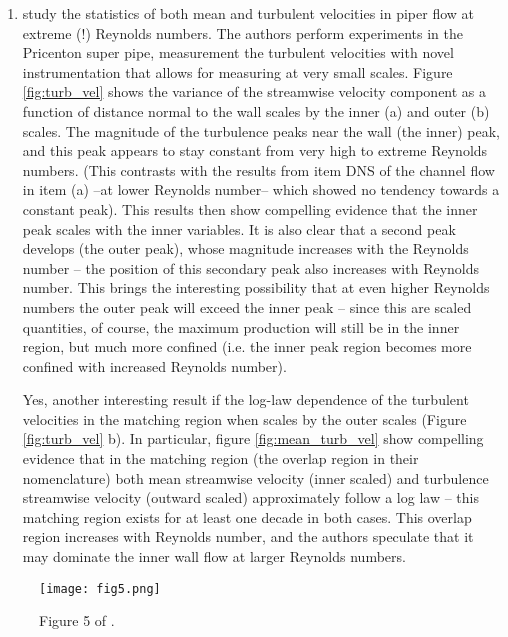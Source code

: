 \documentclass[11pt]{article}
\begin{document}
\begin{enumerate}[label=(\alph*)]
    \item  \cite{hultmark_etal2012} study the statistics of both mean and turbulent velocities in
        piper flow at extreme (!) Reynolds numbers. The authors perform experiments in the Pricenton
        super pipe, measurement the turbulent velocities with novel instrumentation that allows
        for measuring at very small scales. Figure \ref{fig:turb_vel} shows the variance of the
        streamwise velocity component as a function of distance normal to the wall scales by the
        inner (a) and outer (b) scales. The magnitude of the turbulence peaks near the wall (the inner)
        peak, and this peak appears to stay constant from very high to extreme Reynolds numbers. (This 
        contrasts with the results from item DNS of the channel flow in item (a) –at lower Reynolds
         number– which showed no tendency towards a constant peak). This results then show compelling
          evidence that the inner peak scales with the inner variables. It is also clear that a second
         peak develops (the outer peak), whose magnitude increases with the Reynolds number – the position
         of this secondary peak also increases with Reynolds number. This brings the interesting possibility         that at even higher Reynolds numbers the outer peak will exceed the inner peak – since this are
         scaled quantities, of course, the maximum production will still be in the inner region, but much
         more confined (i.e. the inner peak region becomes more confined with increased Reynolds number). 

        Yes, another interesting result if the log-law dependence of the turbulent velocities in the 
        matching region when scales by the outer scales (Figure \ref{fig:turb_vel} b). In particular,
        figure \ref{fig:mean_turb_vel} show compelling evidence that in the matching region (the overlap region 
        in their nomenclature) both mean streamwise velocity (inner scaled) and turbulence streamwise 
        velocity (outward scaled) approximately follow a log law – this matching region exists for at
        least one decade in both cases. This overlap region increases with Reynolds number, and the authors
        speculate that it may dominate the inner wall flow at larger Reynolds numbers.  

\end{enumerate}


\begin{figure}[ht]
\begin{center}
\texttt{[image: fig5.png]}\\
\end{center}
\caption{Figure 5 of \cite{bernardini_etal2014}.}
\label{fig:mean_vel}
\end{figure}
\end{document}
